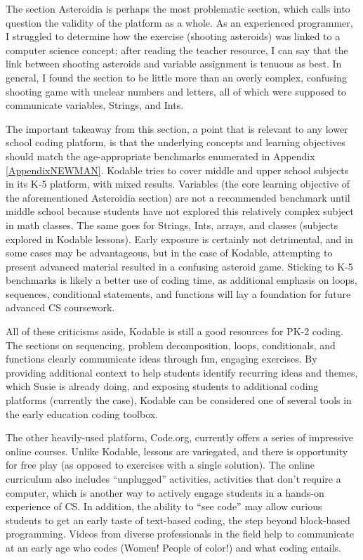\par
The section Asteroidia is perhaps the most problematic section, which calls into question the validity of the platform as a whole. As an experienced programmer, I struggled to determine how the exercise (shooting asteroids) was linked to a computer science concept; after reading the teacher resource, I can say that the link between shooting asteroids and variable assignment is tenuous as best. In general, I found the section to be little more than an overly complex, confusing shooting game with unclear numbers and letters, all of which were supposed to communicate variables, Strings, and Ints.\par
The important takeaway from this section, a point that is relevant to any lower school coding platform, is that the underlying concepts and learning objectives should match the age-appropriate benchmarks enumerated in Appendix \ref{AppendixNEWMAN}. Kodable tries to cover middle and upper school subjects in its K-5 platform, with mixed results. Variables (the core learning objective of the aforementioned Asteroidia section) are not a recommended benchmark until middle school because students have not explored this relatively complex subject in math classes. The same goes for Strings, Ints, arrays, and classes (subjects explored in Kodable lessons). Early exposure is certainly not detrimental, and in some cases may be advantageous, but in the case of Kodable, attempting to present advanced material resulted in a confusing asteroid game. Sticking to K-5 benchmarks is likely a better use of coding time, as additional emphasis on loops, sequences, conditional statements, and functions will lay a foundation for future advanced CS coursework.\par 
All of these criticisms aside, Kodable is still a good resources for PK-2 coding. The sections on sequencing, problem decomposition, loops, conditionals, and functions clearly communicate ideas through fun, engaging exercises. By providing additional context to help students identify recurring ideas and themes, which Susie is already doing, and exposing students to additional coding platforms (currently the case), Kodable can be considered one of several tools in the early education coding toolbox.\par
The other heavily-used platform, Code.org, currently offers a series of impressive online courses. Unlike Kodable, lessons are variegated, and there is opportunity for free play (as opposed to exercises with a single solution). The online curriculum also includes ``unplugged'' activities, activities that don't require a computer, which is another way to actively engage students in a hands-on experience of CS. In addition, the ability to ``see code'' may allow curious students to get an early taste of text-based coding, the step beyond block-based programming. Videos from diverse professionals in the field help to communicate at an early age who codes (Women! People of color!) and what coding entails.\par


